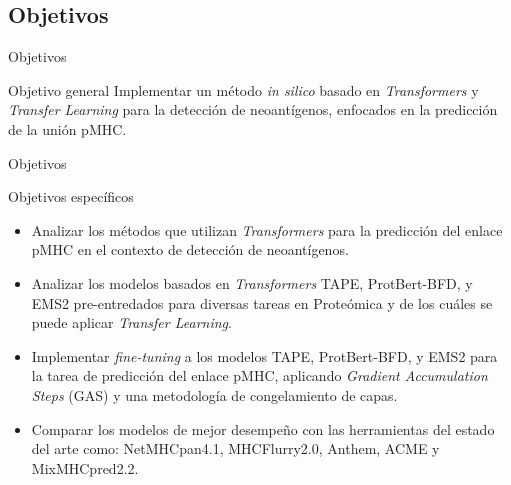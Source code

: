 \documentclass[10pt]{beamer}
\newcommand{\1}{
	\setbeamertemplate{background}{
		\texttt{[image: img/1]}
		\tikz[overlay] \fill[fill opacity=0.75,fill=white] (0,0) rectangle (-\paperwidth,\paperheight);
	}
}
\begin{document}
\subsection{Objetivos}

\begin{frame}{Objetivos}{}	
	\begin{block}{Objetivo general}
		Implementar un método \textit{in silico} basado en \textit{Transformers} y \textit{Transfer Learning} para la detección de neoantígenos, enfocados en la predicción de la unión pMHC. 
	\end{block}	

\end{frame}

\begin{frame}{Objetivos}{}	

	\begin{block}{Objetivos específicos}
		\begin{itemize} 
			\item Analizar los métodos que utilizan \textit{Transformers} para la predicción del enlace pMHC en el contexto de detección de neoantígenos. \pause
			\item Analizar los modelos basados en \textit{Transformers} TAPE, ProtBert-BFD, y EMS2 pre-entredados para diversas tareas en Proteómica y de los cuáles se puede aplicar \textit{Transfer Learning}. 	\pause
			\item Implementar \textit{fine-tuning} a los modelos TAPE, ProtBert-BFD, y EMS2 para la tarea de predicción del enlace pMHC, aplicando \textit{Gradient Accumulation Steps} (GAS) y una metodología de congelamiento de capas. \pause
			\item Comparar los modelos de mejor desempeño con las herramientas del estado del arte como: NetMHCpan4.1, MHCFlurry2.0, Anthem, ACME y MixMHCpred2.2.
		\end{itemize}
	\end{block}	
\end{frame}
\end{document}
